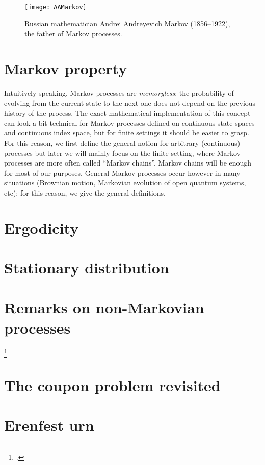 \begin{refsection}
      \begin{figure}
	 \centering
	 \texttt{[image: AAMarkov]}
	 \caption{Russian mathematician Andrei Andreyevich Markov
	    (1856--1922), the father of Markov processes.}
      \end{figure}

      \section{Markov property}

      Intuitively speaking,
      Markov processes are \emph{memoryless}: the probability of evolving from
      the current state to the 
      next one does not depend on the previous history of the process.
      The exact mathematical implementation of this concept can look a bit
      technical for Markov processes defined on continuous state spaces and
      continuous index space, but for finite settings it should be easier to
      grasp.
      For this reason, we first define the general notion for arbitrary
      (continuous) processes but later we will mainly focus on the finite
      setting, where Markov processes are more often called ``Markov chains''.
      Markov chains  will be enough for most of our purposes.
      General Markov processes occur however in many situations (Brownian
      motion, Markovian evolution of open quantum systems, etc); for this
      reason, we give the general definitions.


      \section{Ergodicity}
      \section{Stationary  distribution}

      \section{Remarks on non-Markovian
	 processes}
      \footcite{Van-Kampen:1998}

      

      

      \section{The coupon problem revisited}   
      \section{Erenfest urn}

\end{refsection}
